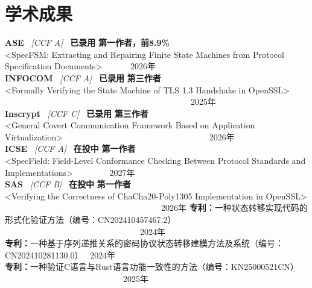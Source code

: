 \documentclass{resume}
\begin{document}
\section{学术成果}
\noindent \textbf{ASE} \ \textit{[CCF A]} \ \textbf{已录用} \hfill \textbf{第一作者，前8.9\%}   \\
<SpecFSM: Extracting and Repairing Finite State Machines from Protocol Specification Documents>  \ \ \ \ \ \ 2026年 \\
\noindent \textbf{INFOCOM} \ \textit{[CCF A]} \ \textbf{已录用} \hfill \textbf{第三作者} \\
<Formally Verifying the State Machine of TLS 1.3 Handshake in OpenSSL>  \ \ \ \ \ \ \ \ \ \ \ \ \ \ \ \ \ \ \ \ \ \ \ \ \ \ \ \ \ \ \ \ \ \ \ \ \ \ \ \ \ \ \ \  2025年 \\
\noindent \textbf{Inscrypt} \ \textit{[CCF C]} \ \textbf{已录用} \hfill \textbf{第三作者} \\      
<General Covert Communication Framework Based on Application Virtualization>  \ \ \ \ \ \ \ \ \ \ \ \ \ \ \ \ \ \ \ \ \ \ \ \ \ \ \ \ \ \ \ \ \ \ 2026年 \\                             
\noindent \textbf{ICSE} \ \textit{[CCF A]} \ \textbf{在投中} \hfill \textbf{第一作者} \\ 
<SpecField: Field-Level Conformance Checking Between Protocol Standards and Implementations>   \ \ \ \ \ \ \ \ 2027年 \\  
\noindent \textbf{SAS} \ \textit{[CCF B]} \ \textbf{在投中} \hfill \textbf{第一作者} \\
<Verifying the Correctness of ChaCha20-Poly1305
Implementation in OpenSSL>  \ \ \ \ \ \ \ \ \ \ \ \ \ \ \ \ \ \ \ \ \ \ \ \ \ \ \ \ \ \ \ \ \ \ \ \ \  2026年
\noindent \textbf{专利：}一种状态转移实现代码的形式化验证方法（编号：CN202410457467.2） \ \ \ \ \ \ \ \ \ \ \ \ \ \ \ \ \ \ \ \ \ \ \ \ \ \ \ \ \ \ \ \ 2024年 \\[0.5ex]
\noindent \textbf{专利：}一种基于序列递推关系的密码协议状态转移建模方法及系统（编号：CN202410281130.0） \   2024年 \\[0.5ex]
\noindent \textbf{专利：}一种验证C语言与Rust语言功能一致性的方法（编号：KN25000521CN） \ \ \ \ \ \ \ \ \ \ \ \ \ \ \ \ \ \ \ \ \ \ \ \ \ \ \ \  2025年
\end{document}
